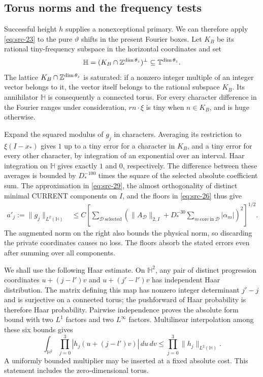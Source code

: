 \subsection{Torus norms and the frequency tests}

Successful height $h$ supplies a nonexceptional primary.  We can
therefore apply \eqref{eq:src-23} to the pure $\vartheta$ shifts in the
present Fourier boxes.  Let $K_B$ be its rational tiny-frequency
subspace in the horizontal coordinates and set
\[
 \mathbb H=(K_B\cap\mathbb Z^{\dim\theta_z})^\perp
 \subseteq\mathbb T^{\dim\theta_z}.
\]
The lattice $K_B\cap\mathbb Z^{\dim\theta_z}$ is saturated: if a nonzero
integer multiple of an integer vector belongs to it, the vector itself
belongs to the rational subspace $K_B$.  Its annihilator $\mathbb H$
is consequently a connected torus.  For every character difference
in the Fourier ranges under consideration, $r n\cdot\xi$ is tiny when
$n\in K_B$, and is huge otherwise.

Expand the squared modulus of $g_j$ in characters.  Averaging its
restriction to $\xi(I-x_*)$ gives $1$ up to a tiny error for a character
in $K_B$, and a tiny error for every other character, by integration
of an exponential over an interval.  Haar integration on $\mathbb H$
gives exactly $1$ and $0$, respectively.  The difference between these
averages is bounded by $D_*^{-100}$ times the square of the selected
absolute coefficient sum.  The approximation in
\eqref{eq:src-29}, the almost orthogonality of distinct minimal CURRENT
components on $I$, and the floors in \eqref{eq:src-26} thus give
\begin{equation*}
 \begin{split}
 a'_j:=\|g_j\|_{L^2(\mathbb H)}
 &\leq C\left[
 \sum_{\mathcal D\ \mathrm{selected}}
 \left(\|A_{\mathcal D}\|_{2,I}
       +D_*^{-30}
        \sum_{m\ \mathrm{core\ in}\ \mathcal D}|\alpha_m|
 \right)^2\right]^{1/2}.
 \end{split}
 \tag{30}\label{eq:src-30}
\end{equation*}
The augmented norm on the right also bounds the physical norm, so
discarding the private coordinates causes no loss.  The floors absorb
the stated errors even after summing over all components.

We shall use the following Haar estimate.  On $\mathbb H^2$, any pair
of distinct progression coordinates $u+(j-l')v$ and $u+(j'-l')v$ has
independent Haar distribution.  The matrix defining this map has
nonzero integer determinant $j'-j$ and is surjective on a connected
torus; the pushforward of Haar probability is therefore Haar
probability.  Pairwise independence proves the absolute form bound
with two $L^1$ factors and two $L^\infty$ factors.  Multilinear
interpolation among these six bounds gives
\[
 \int_{\mathbb H^2}\prod_{j=0}^3
 |h_j(u+(j-l')v)|\,du\,dv
 \leq\prod_{j=0}^3\|h_j\|_{L^2(\mathbb H)}.
\]
A uniformly bounded multiplier may be inserted at a fixed absolute
cost.  This statement includes the zero-dimensional torus.

